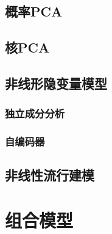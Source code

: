\documentclass[11pt]{ctexbook}
\begin{document}
\section{概率PCA}
\section{核PCA}
\section{非线形隐变量模型}
\subsection{独立成分分析}
\subsection{自编码器}
\section{非线性流行建模}

\chapter{组合模型}
\end{document}
